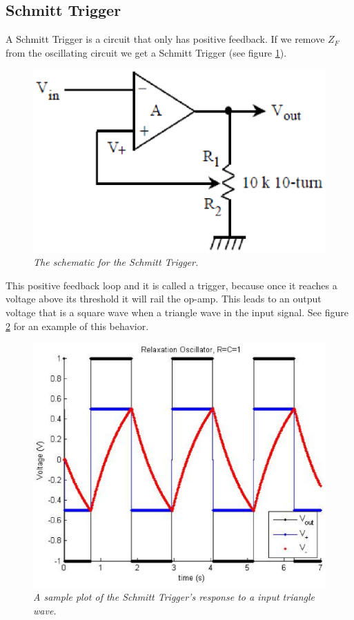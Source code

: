 \documentclass[11pt]{article}
\numberwithin{equation}{section}
\numberwithin{figure}{section}
\numberwithin{table}{section}
\begin{document}
\subsection{Schmitt Trigger}
A Schmitt Trigger is a circuit that only has positive feedback. If we remove $Z_F$ from the oscillating circuit we get a Schmitt Trigger (see figure \ref{FigSTrigSchem}).
\begin{figure}[h]
\centering
\includegraphics[scale=0.60]{FigSTrigSchem.eps}
\caption{\textit{The schematic for the Schmitt Trigger.}}
\label{FigSTrigSchem}
\end{figure}
This positive feedback loop and it is called a trigger, because once it reaches a voltage above its threshold it will rail the op-amp. This leads to an output voltage that is a square wave when a triangle wave in the input signal. See figure \ref{FigSTrigEXPlot} for an example of this behavior.
\begin{figure}[h]
\centering
\includegraphics[scale=0.60]{FigSTrigEXPlot.eps}
\caption{\textit{A sample plot of the Schmitt Trigger's response to a input triangle wave.}}
\label{FigSTrigEXPlot}
\end{figure}
\end{document}
